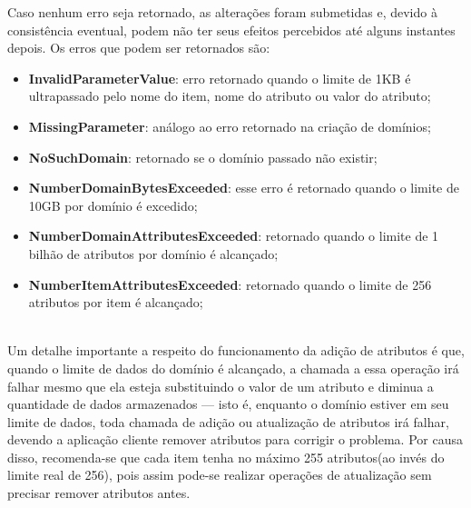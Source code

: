Caso nenhum erro seja retornado, as alterações foram submetidas e, devido à consistência eventual, podem não ter seus efeitos percebidos até alguns instantes depois. Os erros que podem ser retornados são:
\\
\begin{itemize}
	\item \textbf{InvalidParameterValue}: erro retornado quando o limite de 1KB é ultrapassado pelo nome do item, nome do atributo ou valor do atributo;
	\item \textbf{MissingParameter}: análogo ao erro retornado na criação de domínios;
	\item \textbf{NoSuchDomain}: retornado se o domínio passado não existir;
	\item \textbf{NumberDomainBytesExceeded}: esse erro é retornado quando o limite de 10GB por domínio é excedido;
	\item \textbf{NumberDomainAttributesExceeded}: retornado quando o limite de 1 bilhão de atributos por domínio é alcançado;
	\item \textbf{NumberItemAttributesExceeded}: retornado quando o limite de 256 atributos por item é alcançado;
\end{itemize}
\\
Um detalhe importante a respeito do funcionamento da adição de atributos é que, quando o limite de dados do domínio é alcançado, a chamada a essa operação irá falhar mesmo que ela esteja substituindo o valor de um atributo e diminua a quantidade de dados armazenados --- isto é, enquanto o domínio estiver em seu limite de dados, toda chamada de adição ou atualização de atributos irá falhar, devendo a aplicação cliente remover atributos para corrigir o problema. Por causa disso, recomenda-se que cada item tenha no máximo 255 atributos(ao invés do limite real de 256), pois assim pode-se realizar operações de atualização sem precisar remover atributos antes.


